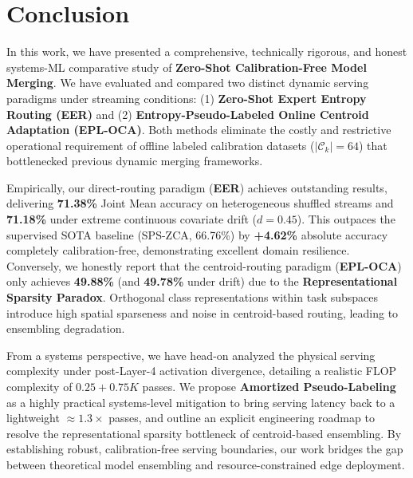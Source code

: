 \section{Conclusion}
\label{sec:conclusion}

In this work, we have presented a comprehensive, technically rigorous, and honest systems-ML comparative study of \textbf{Zero-Shot Calibration-Free Model Merging}. We have evaluated and compared two distinct dynamic serving paradigms under streaming conditions: (1) \textbf{Zero-Shot Expert Entropy Routing (EER)} and (2) \textbf{Entropy-Pseudo-Labeled Online Centroid Adaptation (EPL-OCA)}. Both methods eliminate the costly and restrictive operational requirement of offline labeled calibration datasets ($|\mathcal{C}_k|=64$) that bottlenecked previous dynamic merging frameworks.

Empirically, our direct-routing paradigm (\textbf{EER}) achieves outstanding results, delivering \textbf{71.38\%} Joint Mean accuracy on heterogeneous shuffled streams and \textbf{71.18\%} under extreme continuous covariate drift ($d=0.45$). This outpaces the supervised SOTA baseline (SPS-ZCA, 66.76\%) by \textbf{+4.62\%} absolute accuracy completely calibration-free, demonstrating excellent domain resilience. Conversely, we honestly report that the centroid-routing paradigm (\textbf{EPL-OCA}) only achieves \textbf{49.88\%} (and \textbf{49.78\%} under drift) due to the \textbf{Representational Sparsity Paradox}. Orthogonal class representations within task subspaces introduce high spatial sparseness and noise in centroid-based routing, leading to ensembling degradation.

From a systems perspective, we have head-on analyzed the physical serving complexity under post-Layer-4 activation divergence, detailing a realistic FLOP complexity of $0.25 + 0.75K$ passes. We propose \textbf{Amortized Pseudo-Labeling} as a highly practical systems-level mitigation to bring serving latency back to a lightweight $\approx 1.3\times$ passes, and outline an explicit engineering roadmap to resolve the representational sparsity bottleneck of centroid-based ensembling. By establishing robust, calibration-free serving boundaries, our work bridges the gap between theoretical model ensembling and resource-constrained edge deployment.

